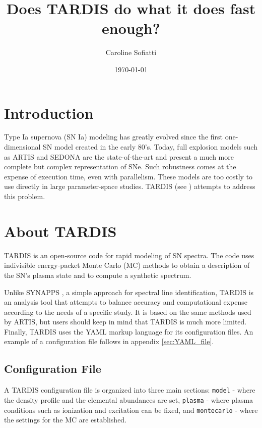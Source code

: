 \documentclass[letterpaper,12pt]{article}
\begin{document}
\title{Does TARDIS do what it does fast enough?}
\author{Caroline Sofiatti}
\date{\today}
\maketitle
\tableofcontents

\section{\label{sec:intro}Introduction}

Type Ia supernova (SN Ia) modeling has greatly evolved since the first one-dimensional SN model created in the early 80's\cite{80s}. Today, full explosion models such as ARTIS \cite{artis} and SEDONA \cite{sedona} are the state-of-the-art and present a much more complete but complex representation of SNe. Such robustness comes at the expense of execution time, even with parallelism. These models are too costly to use directly in large parameter-space studies. TARDIS (see \cite{tardis}) attempts to address this problem.

\section{\label{sec:about_tardis} About TARDIS}
TARDIS is an open-source code for rapid modeling of SN spectra. The code uses indivisible energy-packet Monte Carlo (MC) methods \cite{lucy} \cite{lucy_2002} \cite{lucy_2003} to obtain a description of the SN's plasma state and to compute a synthetic spectrum. 

Unlike SYNAPPS \cite{synapps}, a simple approach for spectral line identification, TARDIS is an analysis tool that attempts to balance accuracy and computational expense according to the needs of a specific study. It is based on the same methods used by ARTIS, but users should keep in mind that TARDIS is much more limited. Finally, TARDIS uses the YAML markup language for its configuration files. An example of a configuration file follows in appendix \ref{sec:YAML_file}.

\subsection{\label{sec:config} Configuration File}
A TARDIS configuration file is organized into three main sections: \texttt{model} - where the density profile and the elemental abundances are set, \texttt{plasma} - where plasma conditions such as ionization and excitation can be fixed, and \texttt{montecarlo} - where the settings for the MC are established. 
\end{document}
